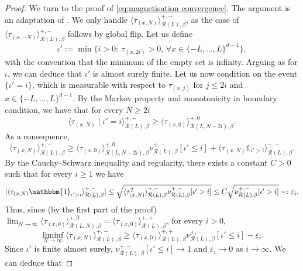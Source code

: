 \documentclass[11pt,a4paper]{article}
\numberwithin{equation}{section}
\theoremstyle{plain}
\theoremstyle{definition}
\begin{document}
\begin{proof}
We turn to the proof of \eqref{eq:magnetisation convergence}. The argument is an adaptation of \cite[Lemma~5.6]{gunaratnam2025supercritical}. We only handle $\langle \tau_{(x,N)} \rangle^{+,-}_{\mathcal{R}(L),\beta}$, as the case of $\langle \tau_{(x,-N)} \rangle^{+,-}_{\mathcal{R}(L),\beta}$ follows by global flip. Let us define 
\begin{equation}
\iota' := \min \{i>0:~ \tau_{(x,2i)} >0, \, \forall x \in \{-L,\ldots, L \}^{d-1}\},
\end{equation}
with the convention that the minimum of the empty set is infinity.
Arguing as for $\iota$, we can deduce that $\iota'$ is almost surely finite. Let us now condition on the event $\{\iota' = i\}$, which is measurable with respect to $\tau_{(x,j)}$ for $j\leq 2i$ and $x \in \{-L,\ldots,L\}^{d-1}$. By the Markov property and monotonicity in boundary condition, we have that for every $N\geq 2i$
\begin{equation}
\langle \tau_{(x,N)} 
 \mid \iota' = i \rangle^{+,-}_{\mathcal{R}(L),\beta}\geq  \langle \tau_{(x,0)} \rangle^{+,0}_{\mathcal{R}(L,N-2i),\beta}.
\end{equation}
As a consequence,
\begin{equation}
    \langle \tau_{(x,N)}  \rangle^{+,-}_{\mathcal{R}(L),\beta}\geq \langle \tau_{(x,0)} \rangle^{+,0}_{\mathcal{R}(L,N-2i),\beta}\nu_{\mathcal{R}(L),\beta}^{+,-}[\iota'\leq i]+\langle \tau_{(x,N)}\mathds{1}_{\iota'>i}  \rangle^{+,-}_{\mathcal{R}(L),\beta}.
\end{equation}
By the Cauchy--Schwarz inequality and regularity, there exists a constant $C>0$ such that for every $i\geq 1$ we have
\begin{equation}
|\langle \tau_{(x,N)} 
\mathbbm{1}_{\iota'>i} \rangle^{+,-}_{\mathcal{R}(L),\beta}|\leq \sqrt{\langle \tau^2_{(x,N)}  \rangle^{+,-}_{\mathcal{R}(L),\beta}\nu_{\mathcal{R}(L),\beta}^{+,-}[\iota'>i]}
\leq C\sqrt{\nu_{\mathcal{R}(L),\beta}^{+,-}[\iota'>i]}=: \varepsilon_i.
\end{equation}
Thus, since (by the first part of the proof) $\lim_{N\to\infty}\langle \tau_{(x,0)} \rangle^{+,0}_{\mathcal{R}(L,N),\beta}=\langle \tau_{(x,0)} \rangle^{+,+}_{\mathcal{R}(L),\beta}$, for every $i>0$,
\begin{equation}
\liminf_{N\to\infty} \langle \tau_{(x,N)} 
 \rangle^{+,-}_{\mathcal{R}(L),\beta}\geq \langle \tau_{(x,0)} \rangle^{+,+}_{\mathcal{R}(L),\beta}\nu_{\mathcal{R}(L),\beta}^{+,-}[\iota'\leq i]-\varepsilon_i.
 \end{equation}
 Since $\iota'$ is finite almost surely, $\nu_{\mathcal{R}(L),\beta}^{+,-}[\iota'\leq i]\rightarrow 1$ and $\varepsilon_i\rightarrow 0$ as $i\rightarrow \infty$. We can deduce that 

\end{proof}
\end{document}
